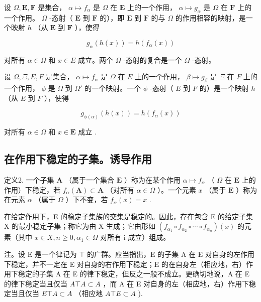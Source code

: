 设 \(\Omega, \mathbf{E}, \mathbf{F}\) 是集合， \(\alpha \mapsto f_{\alpha}\) 是 \(\Omega\) 在 \(\mathbf{E}\) 上的一个作用， \(\alpha \mapsto g_{\alpha}\) 是 \(\Omega\) 在 \(\mathbf{F}\) 上的一个作用。 \(\Omega\) -态射（ \(\mathbf{E}\) 到 \(\mathbf{F}\) 的），即 \(\mathbf{E}\) 到 \(\mathbf{F}\) 的与 \(\Omega\) 的作用相容的映射，是一个映射 \(h\) （从 \(\mathbf{E}\) 到 \(\mathbf{F}\) ），使得

\[
g _ {\alpha} (h (x)) = h \left(f _ {\alpha} (x)\right)
\]

对所有 \(\alpha \in \Omega\) 和 \(x \in E\) 成立。两个 \(\Omega\) -态射的复合是一个 \(\Omega\) -态射。

设 \(\Omega, \Xi, E, F\) 是集合， \(\alpha \mapsto f_{\alpha}\) 是 \(\Omega\) 在 \(E\) 上的一个作用， \(\beta \mapsto g_{\beta}\) 是 \(\Xi\) 在 \(F\) 上的一个作用， \(\phi\) 是 \(\Omega\) 到 \(\Omega'\) 的一个映射。一个 \(\phi\) -态射（ \(E\) 到 \(F\) 的）是一个映射 \(h\) （从 \(E\) 到 \(F\) ），使得

\[
g _ {\phi (\alpha)} (h (x)) = h (f _ {\alpha} (x))
\]

对所有 \(\alpha \in \Omega\) 和 \(x \in \mathbf{E}\) 成立 .

\subsection{在作用下稳定的子集。诱导作用}

定义2. 一个子集 \(\mathbf{A}\) （属于一个集合 \(\mathbf{E}\) ）称为在某个作用 \(\alpha \mapsto f_{\alpha}\) （ \(\Omega\) 在 \(\mathbf{E}\) 上的作用）下稳定，若 \(f_{\alpha}(\mathbf{A}) \subset \mathbf{A}\) （对所有 \(\alpha \in \Omega\) ）。一个元素 \(x\) （属于 \(\mathbf{E}\) ）称为在元素 \(\alpha\) （属于 \(\Omega\) ）下不变，若 \(f_{\alpha}(x) = x\) .

在给定作用下，E 的稳定子集族的交集是稳定的。因此，存在包含 E 的给定子集 X 的最小稳定子集；称它为由 X 生成；它由形如 \((f_{\alpha_{1}} \circ f_{\alpha_{2}} \circ \cdots \circ f_{\alpha_{n}})(x)\) 的元素（其中 \(x \in X, n \geqslant 0, \alpha_{1} \in \Omega\) 对所有 i 成立）组成。

注。设 E 是一个律记为 \(\top\) 的广群。应当指出，E 的子集 A 在 E 对自身的左作用下稳定，并不一定在 E 对自身的右作用下稳定；E 的在自身左（相应地，右）作用下稳定的子集 A 在 E 的律下稳定，但反之一般不成立。更确切地说，A 在 E 的律下稳定当且仅当 \(A \top A \subset A\) ，而 A 在 E 对自身的左（相应地，右）作用下稳定当且仅当 \(E \top A \subset A\) （相应地 \(A \top E \subset A\) ).

